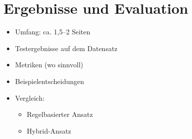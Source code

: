 \section{Ergebnisse und Evaluation}
\begin{itemize}
    \item Umfang: ca. 1,5--2 Seiten
    \item Testergebnisse auf dem Datensatz
    \item Metriken (wo sinnvoll)
    \item Beispielentscheidungen
    \item Vergleich:
    \begin{itemize}
        \item Regelbasierter Ansatz
        \item Hybrid-Ansatz
    \end{itemize}
\end{itemize}